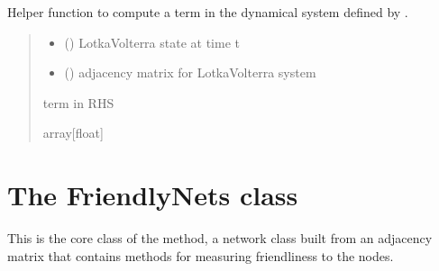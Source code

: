 \documentclass[letterpaper,10pt,english]{sphinxmanual}
\begin{document}

\begin{fulllineitems}
\label{\detokenize{sensit:sensitivity.compute_j}}
\pysigstartsignatures
{}
\pysigstopsignatures
\sphinxAtStartPar
Helper function to compute a term in the dynamical system defined by {\hyperref[\detokenize{sensit:sensitivity.sense_kl}]{}}.
\begin{quote}\begin{description}
\begin{itemize}
\item {} 
\sphinxAtStartPar
{} (\sphinxstyleliteralemphasis{\sphinxupquote{{[}}}\sphinxstyleliteralemphasis{\sphinxupquote{{]}}}) \textendash{} Lotka\sphinxhyphen{}Volterra state at time t

\item {} 
\sphinxAtStartPar
{} (\sphinxstyleliteralemphasis{\sphinxupquote{{[}}}\sphinxstyleliteralemphasis{\sphinxupquote{{]}}}) \textendash{} adjacency matrix for Lotka\sphinxhyphen{}Volterra system

\end{itemize}

\sphinxAtStartPar
term in RHS

\sphinxAtStartPar
array{[}float{]}

\end{description}\end{quote}

\end{fulllineitems}


\sphinxstepscope


\chapter{The FriendlyNets class}
\label{\detokenize{friendlynets:the-friendlynets-class}}\label{\detokenize{friendlynets::doc}}
\sphinxAtStartPar
This is the core class of the method, a network class built from an adjacency matrix that contains methods for measuring friendliness to the nodes.
\end{document}
